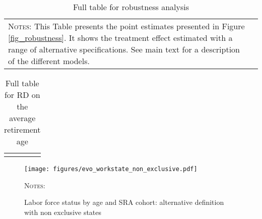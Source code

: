 \documentclass[12pt,a4paper]{article}
\begin{document}
\begin{table}[H]	
	\caption{Full table for robustness analysis}
	\footnotesize
	\label{table_RD_robustness}
	\begin{adjustbox}{max width = \textwidth, max totalheight=.7\textheight, keepaspectratio}
		\hspace*{-1cm}
		
		\hspace*{-1cm}
	\end{adjustbox}
	\vspace*{0.2cm}
	\scriptsize
	\begin{tabular}{ll}
		\begin{minipage}{15cm}%
	    \textsc{Notes:} This Table presents the point estimates presented in Figure \ref{fig_robustness}. It shows the treatment effect estimated with a range of alternative specifications. See main text for a description of the different models. 
		\end{minipage}%
	\end{tabular}
	\normalsize
\end{table}


\begin{table}[H]	
	\caption{Full table for RD on the average retirement age}
	\footnotesize
	\label{table_RD_average}
	\begin{adjustbox}{max width = \textwidth, max totalheight=.7\textheight, keepaspectratio}
		\hspace*{-1cm}
		
		\hspace*{-1cm}
	\end{adjustbox}
	\vspace*{0.2cm}
	\scriptsize
	\begin{tabular}{ll}
		\begin{minipage}{15cm}%
		\end{minipage}%
	\end{tabular}
	\normalsize
\end{table}



\begin{figure}[H]
\begin{adjustwidth}{-1in}{-1in}	
\caption{Labor force status by age and SRA cohort: alternative definition with non exclusive states}
\label{RD_plot_non_exclusive}
\centering
\texttt{[image: figures/evo\_workstate\_non\_exclusive.pdf]}
\end{adjustwidth}
\begin{minipage}{15cm}%
	\textsc{Notes:} 
\end{minipage}%
\end{figure}
\end{document}
